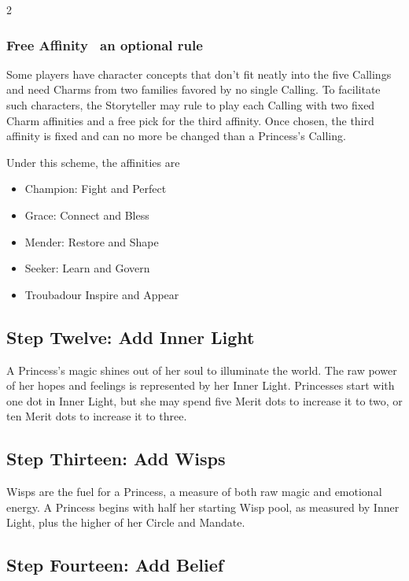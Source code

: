 \begin{multicols}{2}
\begin{mybox}
\subsubsection*{Free Affinity \textemdash\, an optional rule}
Some players have character concepts that don’t fit neatly into the five Callings and need Charms from two families favored by no single Calling. To facilitate such characters, the Storyteller may rule to play each Calling with two fixed Charm affinities and a free pick for the third affinity. Once chosen, the third affinity is fixed and can no more be changed than a Princess's Calling.

Under this scheme, the affinities are

\begin{itemize}
\item Champion: Fight and Perfect
\item Grace: Connect and Bless
\item Mender: Restore and Shape
\item Seeker: Learn and Govern
\item Troubadour Inspire and Appear
\end{itemize}

\end{mybox}


\subsection*{Step Twelve: Add Inner Light}

A Princess's magic shines out of her soul to illuminate the world. The raw power of her hopes and feelings is represented by her Inner Light. Princesses start with one dot in Inner Light, but she may spend five Merit dots to increase it to two, or ten Merit dots to increase it to three. 

\subsection*{Step Thirteen: Add Wisps}

Wisps are the fuel for a Princess, a measure of both raw magic and emotional energy. A Princess begins with half her starting Wisp pool, as measured by Inner Light, plus the higher of her Circle and Mandate.

\subsection*{Step Fourteen: Add Belief} 


\end{multicols}
